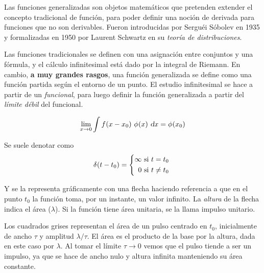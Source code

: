 Las funciones generalizadas son objetos matemáticos que pretenden extender el concepto tradicional de función, para poder definir una noción de derivada para funciones que no son derivables.
Fueron introducidas por Serguéi Sóbolev en 1935 y formalizadas en 1950 por Laurent Schwartz en su \emph{teoría de distribuciones}.

Las funciones tradicionales se definen con una asignación entre conjuntos y una fórmula, y el cálculo infinitesimal está dado por la integral de Riemann.
En cambio, \textbf{a muy grandes rasgos}, una función generalizada se define como una función partida según el entorno de un punto.
El estudio infinitesimal se hace a partir de un \emph{funcional}, para luego definir la función generalizada a partir del \emph{límite débil} del funcional.

\begin{mdframed}[style=MyFrame1]
    \begin{prop}
        \label{prop:limDebil}
    \end{prop}
    \begin{equation*}
        \lim_{x \to 0} \int \fx{x-x_0} \, \fx[\phi]{x} \, \dif x = \fx[\phi]{x_0}
    \end{equation*}
\end{mdframed}


Se suele denotar como
\begin{equation*}
    \fx[\delta]{t-t_0} =
    \left\{
    \begin{aligned}
        \infty \text{ si $t=t_0$ }
        \\
        0 \text{ si $t \neq t_0$ }
    \end{aligned}
    \right.
\end{equation*}

Y se la representa gráficamente con una flecha haciendo referencia a que en el punto $t_0$ la función toma, por un instante, un valor infinito.
La \emph{altura} de la flecha indica el área ($\lambda$).
Si la función tiene área unitaria, se la llama impulso unitario.

\begin{center}
    \def\svgwidth{0.6\linewidth}
    
\end{center}

Los cuadrados grises representan el área de un pulso centrado en $t_0$, inicialmente de ancho $\tau$ y amplitud $\lambda / \tau$.
El área es el producto de la base por la altura, dada en este caso por $\lambda$.
Al tomar el límite $\tau \to 0$ vemos que el pulso tiende a ser un impulso, ya que se hace de ancho nulo y altura infinita manteniendo su área constante.

